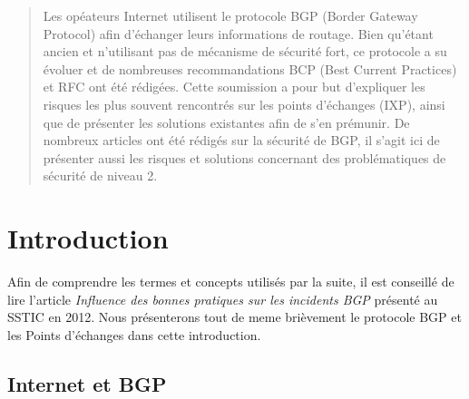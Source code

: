 



\maketitle
{}

\begin{abstract}
 Les opéateurs Internet utilisent le protocole BGP (Border Gateway Protocol) afin d'échanger leurs informations de routage. Bien qu'étant ancien et n'utilisant pas de mécanisme de sécurité fort, ce protocole a su évoluer et de nombreuses recommandations BCP (Best Current Practices) et RFC ont été rédigées.
 Cette soumission a pour but d'expliquer les risques les plus souvent rencontrés sur les points d'échanges (IXP), ainsi que de présenter les solutions existantes afin de s'en prémunir. 
 De nombreux articles ont été rédigés sur la sécurité de BGP, il s'agit ici de présenter aussi les risques et solutions concernant des problématiques de sécurité de niveau 2.
\end{abstract}


\section{Introduction}

Afin de comprendre les termes et concepts utilisés par la suite, il est conseillé de lire l'article \emph{Influence des bonnes pratiques sur les incidents BGP} \cite{fenioux:SSTIC2012} présenté au SSTIC en 2012. Nous présenterons tout de meme brièvement le protocole BGP et les Points d'échanges dans cette introduction.

\subsection{Internet et BGP}

